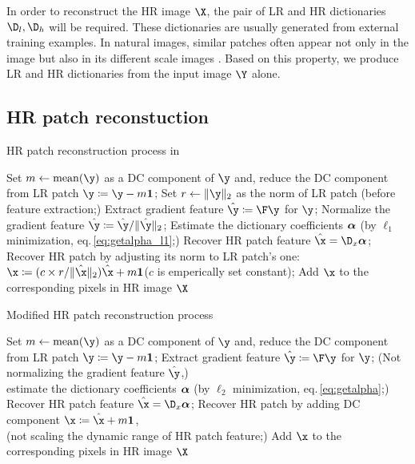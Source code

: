 \documentclass[10pt,japanese]{ikelab-sips}
\begin{document}
In order to reconstruct the HR image $\X$, the pair of LR and HR dictionaries $\D_l, \D_h$ will be required.
These dictionaries are usually generated from external training examples.
In natural images, similar patches often appear not only in the
image but also in its different scale images \cite{Glasner2009}.
Based on this property, we produce LR and HR dictionaries from the input image $\Y$ alone.


\subsection{HR patch reconstuction}

 \begin{algorithm}[t]
  \caption{HR patch reconstruction process in \cite{Yang2012}} \label{algo:prev}
  \begin{algorithmic}[1]
   \STATE Set $m\leftarrow\mathrm{mean}(\y)$ as a DC component of $\y$ and,
   \STATE reduce the DC component from LR patch $\y\coloneqq\y-m\bm{1}$;
   \STATE Set $r\leftarrow\|\y\|_2$ as the norm of LR patch (before feature extraction;)
   \STATE Extract gradient feature $\hat\y\coloneqq\F\y$ for $\y$;
   \STATE Normalize the gradient feature $\hat\y\coloneqq\hat\y/\|\hat\y\|_2$;
   \STATE Estimate the dictionary coefficients $\bm{\alpha}$ (by $\ell_1$ minimization, eq.\,\ref{eq:getalpha_l1};)
   \STATE Recover HR patch feature $\hat\x=\D_x\a$;
   \STATE Recover HR patch by adjusting its norm to LR patch's one: \\
   $\x\coloneqq (c \times r / \|\hat\x\|_2) \hat\x + m\bm{1}$\quad ($c$ is emperically set constant);
   \STATE Add $\x$ to the corresponding pixels in HR image $\X$
   \ENDFOR
  \end{algorithmic}
 \end{algorithm}

 \begin{algorithm}[t]
  \caption{Modified HR patch reconstruction process} \label{algo:prop}
  \begin{algorithmic}[1]
   \STATE Set $m\leftarrow \mathrm{mean}(\y)$ as a DC component of $\y$ and,
   \STATE reduce the DC component from LR patch $\y\coloneqq\y-m\bm{1}$;
   \STATE Extract gradient feature $\hat\y\coloneqq\F\y$ for $\y$;
   \STATE (Not normalizing the gradient feature $\hat\y$,) \\
   estimate the dictionary coefficients $\bm{\alpha}$ (by $\ell_2$ minimization, eq.\,\ref{eq:getalpha};)
   \STATE Recover HR patch feature $\hat\x=\D_x\a$;
   \STATE Recover HR patch by adding DC component $\x\coloneqq\hat\x+m\bm{1}$, \\
   (not scaling the dynamic range of HR patch feature;)
   \STATE Add $\x$ to the corresponding pixels in HR image $\X$
   \ENDFOR
  \end{algorithmic}
 \end{algorithm}
\end{document}

